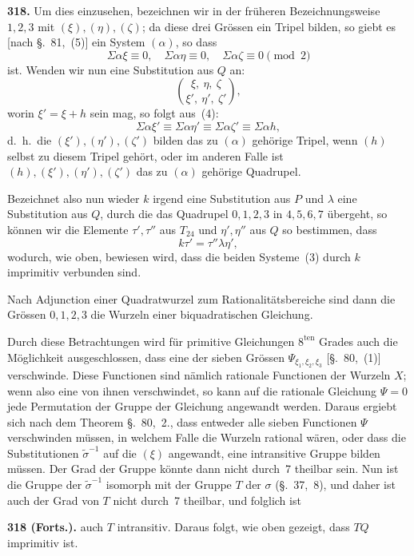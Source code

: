 \documentclass[12pt,a4paper]{article}
\begin{document}
\bigskip
\noindent\textbf{318.} Um dies einzusehen, bezeichnen wir in der fr\"uheren Bezeichnungsweise $1,2,3$ mit $(\xi),(\eta),(\zeta)$; da diese drei Gr\"ossen ein Tripel bilden, so giebt es [nach \S.~81,~(5)] ein System $(\alpha)$, so dass
\begin{equation}
\tag{4}
\Sigma\alpha\xi \equiv 0,\quad \Sigma\alpha\eta \equiv 0,\quad \Sigma\alpha\zeta \equiv 0 \pmod 2
\end{equation}
ist. Wenden wir nun eine Substitution aus $Q$ an:
\[
\binom{\xi,\ \eta,\ \zeta}{\xi',\ \eta',\ \zeta'},
\]
worin $\xi' = \xi + h$ sein mag, so folgt aus~(4):
\[
\Sigma\alpha\xi' \equiv \Sigma\alpha\eta' \equiv \Sigma\alpha\zeta' \equiv \Sigma\alpha h,
\]
d.~h.\ die $(\xi'),(\eta'),(\zeta')$ bilden das zu $(\alpha)$ geh\"orige Tripel, wenn $(h)$ selbst zu diesem Tripel geh\"ort, oder im anderen Falle ist $(h),(\xi'),(\eta'),(\zeta')$ das zu $(\alpha)$ geh\"orige Quadrupel.

Bezeichnet also nun wieder $k$ irgend eine Substitution aus $P$ und $\lambda$ eine Substitution aus $Q$, durch die das Quadrupel $0,1,2,3$ in $4,5,6,7$ \"ubergeht, so k\"onnen wir die Elemente $\tau',\tau''$ aus $T_{24}$ und $\eta',\eta''$ aus $Q$ so bestimmen, dass
\[
k\tau' = \tau''\lambda\eta',
\]
wodurch, wie oben, bewiesen wird, dass die beiden Systeme~(3) durch $k$ imprimitiv verbunden sind.

Nach Adjunction einer Quadratwurzel zum Rationalit\"atsbereiche sind dann die Gr\"ossen $0,1,2,3$ die Wurzeln einer biquadratischen Gleichung.

Durch diese Betrachtungen wird f\"ur primitive Gleichungen $8^{\text{ten}}$ Grades auch die M\"oglichkeit ausgeschlossen, dass eine der sieben Gr\"ossen $\Psi_{\xi_1,\xi_2,\xi_3}$ [\S.~80,~(1)] verschwinde. Diese Functionen sind n\"amlich rationale Functionen der Wurzeln $X$; wenn also eine von ihnen verschwindet, so kann auf die rationale Gleichung $\Psi=0$ jede Permutation der Gruppe der Gleichung angewandt werden. Daraus ergiebt sich nach dem Theorem \S.~80,~2., dass entweder alle sieben Functionen $\Psi$ verschwinden m\"ussen, in welchem Falle die Wurzeln rational w\"aren, oder dass die Substitutionen $\tilde\sigma^{-1}$ auf die $(\xi)$ angewandt, eine intransitive Gruppe bilden m\"ussen. Der Grad der Gruppe k\"onnte dann nicht durch~7 theilbar sein. Nun ist die Gruppe der $\tilde\sigma^{-1}$ isomorph mit der Gruppe $T$ der $\sigma$ (\S.~37,~8), und daher ist auch der Grad von $T$ nicht durch~7 theilbar, und folglich ist

\bigskip
\noindent\textbf{318 (Forts.).} auch $T$ intransitiv. Daraus folgt, wie oben gezeigt, dass $TQ$ imprimitiv ist.
\end{document}
